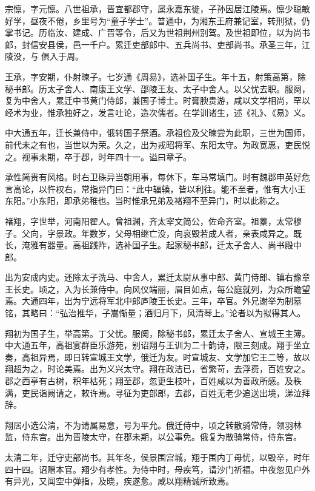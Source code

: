 \documentclass[12pt,UTF8]{ctexbook}
\begin{document}
宗懔，字元懔。八世祖承，晋宜都郡守，属永嘉东徙，子孙因居江陵焉。懔少聪敏好学，昼夜不倦，乡里号为“童子学士”。普通中，为湘东王府兼记室，转刑狱，仍掌书记。历临汝、建成、广晋等令，后又为世祖荆州别驾。及世祖即位，以为尚书郎，封信安县侯，邑一千户。累迁吏部郎中、五兵尚书、吏部尚书。承圣三年，江陵没，与俱入于周。

王承，字安期，仆射暕子。七岁通《周易》，选补国子生。年十五，射策高第，除秘书郎。历太子舍人、南康王文学、邵陵王友、太子中舍人。以父忧去职。服阕，复为中舍人，累迁中书黄门侍郎，兼国子博士。时膏腴贵游，咸以文学相尚，罕以经术为业，惟承独好之，发言吐论，造次儒者。在学训诸生，述《礼》、《易》义。

中大通五年，迁长兼侍中，俄转国子祭酒。承祖俭及父暕尝为此职，三世为国师，前代未之有也，当世以为荣。久之，出为戎昭将军、东阳太守。为政宽惠，吏民悦之。视事未期，卒于郡，时年四十一。谥曰章子。

承性简贵有风格。时右卫硃异当朝用事，每休下，车马常填门。时有魏郡申英好危言高论，以忤权右，常指异门曰：“此中辐辏，皆以利往。能不至者，惟有大小王东阳。”小东阳，即承弟稚也。当时惟承兄弟及褚翔不至异门，时以此称之。

褚翔，字世举，河南阳翟人。曾祖渊，齐太宰文简公，佐命齐室。祖蓁，太常穆子。父向，字景政。年数岁，父母相继亡没，向哀毁若成人者，亲表咸异之。既长，淹雅有器量。高祖践阼，选补国子生。起家秘书郎，迁太子舍人、尚书殿中郎。

出为安成内史。还除太子洗马、中舍人，累迁太尉从事中郎、黄门侍郎、镇右豫章王长史。顷之，入为长兼侍中。向风仪端丽，眉目如点，每公庭就列，为众所瞻望焉。大通四年，出为宁远将军北中郎庐陵王长史。三年，卒官。外兄谢举为制墓铭，其略曰：“弘治推华，子嵩惭量；酒归月下，风清琴上。”论者以为拟得其人。

翔初为国子生，举高第。丁父忧。服阕，除秘书郎，累迁太子舍人、宣城王主簿。中大通五年，高祖宴群臣乐游苑，别诏翔与王训为二十韵诗，限三刻成。翔于坐立奏，高祖异焉，即日转宣城王文学，俄迁为友。时宣城友、文学加它王二等，故以翔超为之，时论美焉。出为义兴太守。翔在政洁已，省繁苛，去浮费，百姓安之。郡之西亭有古树，积年枯死；翔至郡，忽更生枝叶，百姓咸以为善政所感。及秩满，吏民诣阙请之，敕许焉。寻征为吏部郎，去郡，百姓无老少追送出境，涕泣拜辞。

翔居小选公清，不为请属易意，号为平允。俄迁侍中，顷之转散骑常侍，领羽林监，侍东宫。出为晋陵太守，在郡未期，以公事免。俄复为散骑常侍，侍东宫。

太清二年，迁守吏部尚书。其年冬，侯景围宫城，翔于围内丁母忧，以毁卒，时年四十四。诏赠本官。翔少有孝性。为侍中时，母疾笃，请沙门祈福。中夜忽见户外有异光，又闻空中弹指，及晓，疾遂愈。咸以翔精诚所致焉。
\end{document}
